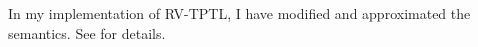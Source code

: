 \documentclass[a4paper]{article}
\newcommand{\tand}{\text{ and }}
\newcommand{\tor}{\text{ or }}
\newcommand{\tiff}{\text{ iff }}
\newcommand{\sn}{\bigcirc^+}
\newcommand{\wn}{\bigcirc^-}
\begin{document}
In my implementation of RV-TPTL, I have modified and approximated the semantics. See  for details.





\end{document}
